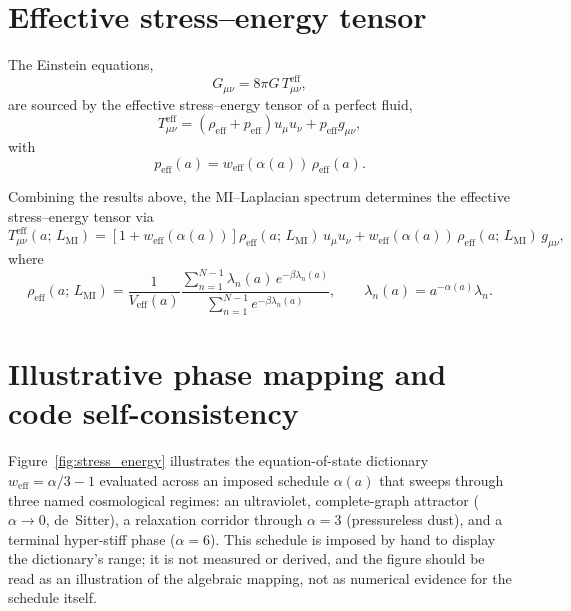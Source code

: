 \documentclass[aps,prd,onecolumn,nofootinbib,preprint]{revtex4-2}
\begin{document}
\section{Effective stress--energy tensor}

The Einstein equations,
\begin{equation}
G_{\mu\nu} = 8\pi G\, T_{\mu\nu}^{\mathrm{eff}},
\end{equation}
are sourced by the effective stress--energy tensor of a perfect fluid,
\begin{equation}
T_{\mu\nu}^{\mathrm{eff}}
= (\rho_{\mathrm{eff}} + p_{\mathrm{eff}}) u_\mu u_\nu
+ p_{\mathrm{eff}} g_{\mu\nu},
\end{equation}
with
\begin{equation}
p_{\mathrm{eff}}(a) = w_{\mathrm{eff}}(\alpha(a))\, \rho_{\mathrm{eff}}(a).
\end{equation}

Combining the results above, the MI--Laplacian spectrum determines the effective stress--energy
tensor via
\begin{equation}
T_{\mu\nu}^{\mathrm{eff}}(a;\, L_{\mathrm{MI}})
=
\left[1 + w_{\mathrm{eff}}(\alpha(a))\right] \rho_{\mathrm{eff}}(a;\, L_{\mathrm{MI}})\, u_\mu u_\nu
+ w_{\mathrm{eff}}(\alpha(a))\, \rho_{\mathrm{eff}}(a;\, L_{\mathrm{MI}})\, g_{\mu\nu},
\end{equation}
where
\begin{equation}
\rho_{\mathrm{eff}}(a;\, L_{\mathrm{MI}})
=
\frac{1}{V_{\mathrm{eff}}(a)}
\frac{\sum_{n=1}^{N-1} \lambda_n(a)\, e^{-\beta \lambda_n(a)}}
     {\sum_{n=1}^{N-1} e^{-\beta \lambda_n(a)}},
\qquad
\lambda_n(a) = a^{-\alpha(a)} \lambda_n.
\end{equation}

\section{Illustrative phase mapping and code self-consistency}

Figure~\ref{fig:stress_energy} illustrates the equation-of-state dictionary
$w_{\mathrm{eff}} = \alpha/3 - 1$ evaluated across an imposed schedule $\alpha(a)$ that sweeps through three
named cosmological regimes: an ultraviolet, complete-graph attractor ($\alpha \to 0$, de~Sitter), a
relaxation corridor through $\alpha = 3$ (pressureless dust), and a terminal hyper-stiff phase
($\alpha = 6$). This schedule is imposed by hand to display the dictionary's range; it is not
measured or derived, and the figure should be read as an illustration of the algebraic mapping, not
as numerical evidence for the schedule itself.
\end{document}
